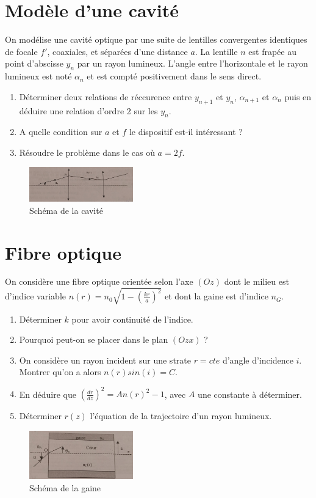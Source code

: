 \documentclass{article}
\begin{document}
\section{Modèle d'une cavité}

On modélise une cavité optique par une suite de lentilles convergentes identiques de focale $f'$, coaxiales, et séparées d'une distance $a$. 
La lentille $n$ est frapée au point d'abscisse $y_n$ par un rayon lumineux.
L'angle entre l'horizontale et le rayon lumineux est noté $\alpha_n$ et est compté positivement dans le sens direct. 
\begin{enumerate}
  \item Déterminer deux relations de réccurence entre $y_{n+1}$ et $y_n$, $\alpha_{n+1}$ et $\alpha_n$ puis en déduire une relation d'ordre 2 sur les $y_n$. 
  \item A quelle condition sur $a$ et $f$ le dispositif est-il intéressant ? 
  \item Résoudre le problème dans le cas où $a=2f$.
\end{enumerate}

\begin{figure}[h!]
  \centering
  \includegraphics[width=0.4\textwidth]{exercice 2.jpg}
    \caption{Schéma de la cavité}
\end{figure}
\newpage
\section{Fibre optique}

On considère une fibre optique orientée selon l'axe $(Oz)$ dont le milieu est d'indice variable $n(r)=n_0 \sqrt{1-(\frac{kr}{a})^2}$ et dont la gaine est d'indice $n_G$. 
\begin{enumerate}
  \item Déterminer $k$ pour avoir continuité de l'indice. 
  \item Pourquoi peut-on se placer dans le plan $(Ozx)$ ? 
  \item On considère un rayon incident sur une strate $r=cte$ d'angle d'incidence $i$. Montrer qu'on a alors $n(r)sin(i) = C$. 
  \item En déduire que $(\frac{dr}{dz})^2 = A n(r)^2 - 1$, avec $A$ une constante à déterminer. 
  \item Déterminer $r(z)$ l'équation de la trajectoire d'un rayon lumineux. 
\end{enumerate}


\begin{figure}[h!]
  \centering
  \includegraphics[width=0.4\textwidth]{exercice 3.jpg}
    \caption{Schéma de la gaine}
\end{figure}
\end{document}
